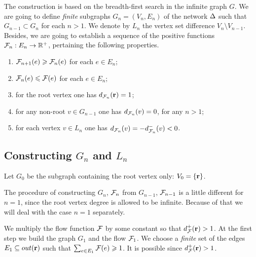 \documentclass[12pt,oneside,a4paper]{amsart}
\begin{document}
        The construction is based on the breadth-first search in the infinite graph $G$.
        We are going to define \emph{finite} subgraphs $G_n = (V_n, E_n)$ of the network $\Delta$ such that $G_{n-1} \subset G_{n}$ for each $n > 1$.
        We denote by $L_n$ the vertex set difference $V_n \setminus V_{n-1}$.
        Besides, we are going to establish a sequence of the positive functions $\mathcal{F}_{n}: E_n \to \mathbb{R}^{+}$,
          pertaining the following properties.
        \begin{enumerate}[label=\textbf{P\arabic*}]
          \item \label{p1} $\mathcal{F}_{n+1}(e) \geqslant \mathcal{F}_{n}(e)$ for each $e \in E_n$;
          \item \label{p2} $\mathcal{F}_{n}(e) \leqslant \mathcal{F}(e)$ for each $e \in E_n$;
          \item \label{p3} for the root vertex one has $d_{\mathcal{F}_{n}}(\mathbf{r}) = 1$;
          \item \label{p4} for any non-root $v \in G_{n-1}$ one has $d_{\mathcal{F}_{n}}(v) = 0$, for any $n > 1$;
          \item \label{p5} for each vertex $v \in L_n$ one has $d_{\mathcal{F}_{n}}(v) = -d^{-}_{\mathcal{F}_{n}}(v) < 0$.
        \end{enumerate}
      \medskip
      \subsection{Constructing \texorpdfstring{$G_n$}{Gn} and \texorpdfstring{$L_n$}{Ln}}
        Let $G_0$ be the subgraph containing the root vertex only: $V_0 = \left\{ \mathbf{r} \right\}$.

        The procedure of constructing $G_n$, $\mathcal{F}_{n}$ from $G_{n-1}$, $\mathcal{F}_{n-1}$
          is a little different for $n = 1$, since the root vertex degree is allowed to be infinite.
        Because of that we will deal with the case $n = 1$ separately.

        We multiply the flow function $\mathcal{F}$ by some constant so that $d^{+}_{\mathcal{F}}(\mathbf{r}) > 1$.
        At the first step we build the graph $G_1$ and the flow $\mathcal{F}_{1}$.
        We choose a \emph{finite} set of the edges
          $E_1 \subseteq out(\mathbf{r})$ such that $\sum_{e \in E_1} \mathcal{F}(e) \geqslant 1$.
        It is possible since $d^{+}_{\mathcal{F}}(\mathbf{r}) > 1$.
\end{document}
